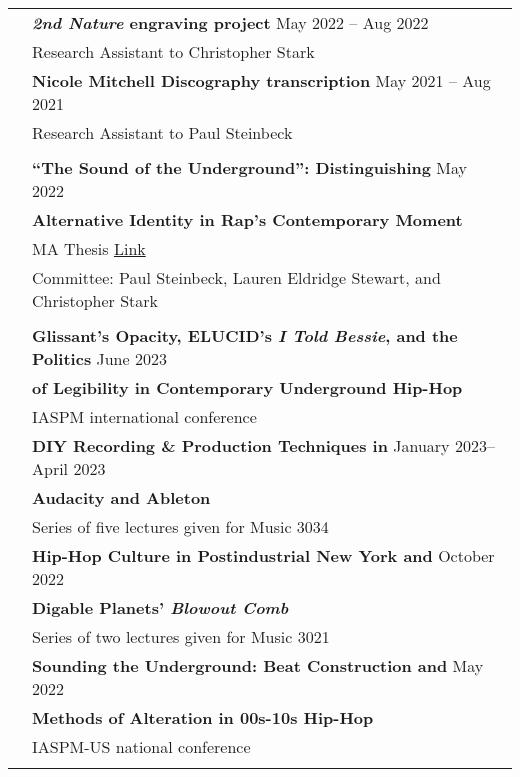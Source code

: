 \documentclass[letterpaper, 11pt]{article}
\begin{document}
\begin{longtable}{p{1.3in}p{4.8in}}
\nohyphens{\color{OliveGreen}{Research Projects}} 
& \textbf{\textit{2nd Nature} engraving project}  \hfill May 2022 -- Aug 2022\\
& Research Assistant to Christopher Stark \\
& \textbf{Nicole Mitchell Discography transcription} \hfill May 2021 -- Aug 2021 \\
& Research Assistant to Paul Steinbeck \\
& \\

\nohyphens{\color{OliveGreen}{Writing Projects}} 
& \textbf{``The Sound of the Underground'': Distinguishing} \hfill{May 2022} \\
& \textbf{Alternative Identity in Rap's Contemporary Moment} \\
& MA Thesis \hfill \href{https://doi.org/10.7936/cftv-at63}{Link} \\
& Committee: Paul Steinbeck, Lauren Eldridge Stewart, and Christopher Stark \\
& \\

\newpage
{\color{OliveGreen}{Presentations}} 
& \textbf{Glissant's Opacity, ELUCID's \textit{I Told Bessie}, and the Politics} \hfill{June 2023} \\
{\color{OliveGreen}{\& Lectures}} 
& \textbf{of Legibility in Contemporary Underground Hip-Hop} \\
& IASPM international conference \\
& \textbf{DIY Recording \& Production Techniques in} \hfill{January 2023--April 2023} \\
& \textbf{Audacity and Ableton} \\
& Series of five lectures given for Music 3034 \\
& \textbf{Hip-Hop Culture in Postindustrial New York and} \hfill{October 2022} \\
& \textbf{Digable Planets' \textit{Blowout Comb}} \\
& Series of two lectures given for Music 3021 \\
& \textbf{Sounding the Underground: Beat Construction and} \hfill{May 2022} \\
& \textbf{Methods of Alteration in 00s-10s Hip-Hop} \\
& IASPM-US national conference \\
& \\


\end{longtable}
\end{document}
